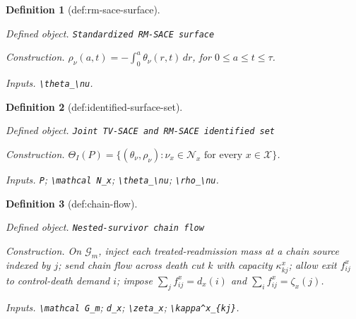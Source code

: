 \documentclass{article}
\newtheorem{definition}{Definition}
\begin{document}
\begin{definition}[def:rm-sace-surface]\label{def:rm-sace-surface}
\par\smallskip\noindent\emph{Defined object.} \texttt{Standardized RM-\allowbreak{}SACE surface}
\par\smallskip\noindent\emph{Construction.} \(\rho_\nu(a,t)=-\int_0^a\theta_\nu(r,t)\,dr\), for \(0\le a\le t\le\tau\).
\par\smallskip\noindent\emph{Inputs.} \texttt{\textbackslash{}\allowbreak{}theta\_\allowbreak{}\textbackslash{}\allowbreak{}nu}.
\end{definition}

\begin{definition}[def:identified-surface-set]\label{def:identified-surface-set}
\par\smallskip\noindent\emph{Defined object.} \texttt{Joint TV-\allowbreak{}SACE and RM-\allowbreak{}SACE identified set}
\par\smallskip\noindent\emph{Construction.} \(\Theta_I(P)=\{(\theta_\nu,\rho_\nu):\nu_x\in\mathcal N_x\text{ for every }x\in\mathcal X\}\).
\par\smallskip\noindent\emph{Inputs.} \texttt{P}; \texttt{\textbackslash{}\allowbreak{}mathcal N\_\allowbreak{}x}; \texttt{\textbackslash{}\allowbreak{}theta\_\allowbreak{}\textbackslash{}\allowbreak{}nu}; \texttt{\textbackslash{}\allowbreak{}rho\_\allowbreak{}\textbackslash{}\allowbreak{}nu}.
\end{definition}

\begin{definition}[def:chain-flow]\label{def:chain-flow}
\par\smallskip\noindent\emph{Defined object.} \texttt{Nested-\allowbreak{}survivor chain flow}
\par\smallskip\noindent\emph{Construction.} On \(\mathcal G_m\), inject each treated-readmission mass at a chain source indexed by \(j\); send chain flow across death cut \(k\) with capacity \(\kappa^x_{kj}\); allow exit \(f^x_{ij}\) to control-death demand \(i\); impose \(\sum_j f^x_{ij}=d_x(i)\) and \(\sum_i f^x_{ij}=\zeta_x(j)\).
\par\smallskip\noindent\emph{Inputs.} \texttt{\textbackslash{}\allowbreak{}mathcal G\_\allowbreak{}m}; \texttt{d\_\allowbreak{}x}; \texttt{\textbackslash{}\allowbreak{}zeta\_\allowbreak{}x}; \texttt{\textbackslash{}\allowbreak{}kappa\textasciicircum{}x\_\allowbreak{}\{kj\}\allowbreak{}}.
\end{definition}
\end{document}
